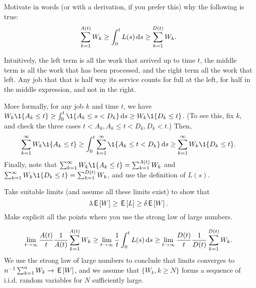 \begin{exercise}
 Motivate in words (or with a derivation, if you prefer this) why the following is true:
 \begin{equation*}
 \sum_{k=1}^{A(t)} W_k \geq \int_0^t L(s) \,\text{d}s \geq \sum_{k=1}^{D(t)} W_k.
 \end{equation*}
\begin{solution}
 Intuitively, the left term is all the work that arrived up to time $t$, the middle term is all the work that has been processed, and the right term all the work that left.
 Any job that that is half way its service counts for full at the left, for half in the middle expression, and not in the right.

 More formally, for any job $k$ and time $t$, we have $W_k \1{A_k \leq t} \geq \int_0^t \1{A_k \leq s < D_k } \d s \geq W_k \1{D_k \leq t}$. (To see this, fix $k$, and check the three cases $t < A_k, A_k \leq t < D_k, D_k < t$.) Then,
 \begin{equation*}
 \sum_{k=1}^\infty W_k \1{A_k \leq t} \geq \int_0^t \sum_{k=1}^\infty \1{A_k \leq t < D_k} \d s \geq \sum_{k=1}^\infty W_k \1{D_k \leq t}. 
 \end{equation*}
 Finally, note that $ \sum_{k=1}^\infty W_k \1{A_k \leq t} = \sum_{k=1}^{A(t)} W_k$ and $ \sum_{k=1}^\infty W_k \1{D_k \leq t} = \sum_{k=1}^{D(t)} W_k$, and use the definition of $L(s)$.
\end{solution}
\end{exercise}

\begin{exercise}
Take suitable limits (and assume all these limits exist) to show that 
 \begin{equation*}
\lambda \,\mathsf{E}\left[W\right] \geq \,\mathsf{E}\left[L\right] \geq \delta \,\mathsf{E}\left[W\right].
 \end{equation*}
 Make explicit all the points where you use the strong law of large numbers.
\begin{solution}
 \begin{equation*}
 \lim_{t\to\infty} \frac{A(t)}{t}\frac 1{A(t)}\sum_{k=1}^{A(t)} W_k \geq \lim_{t\to \infty} \frac 1 t \int_0^t L(s) \,\text{d}s \geq \lim_{t\to\infty} \frac{D(t)}{t}\frac 1{D(t)} \sum_{k=1}^{D(t)} W_k. 
 \end{equation*}
 We use the strong law of large numbers to conclude that limits converges to $n^{-1} \sum_{k=1}^n W_k \to \,\mathsf{E}\left[W\right]$, and we assume that $\{W_k, k\geq N\}$ forms a sequence of i.i.d.
 random variables for $N$ sufficiently large.
\end{solution}
\end{exercise}


